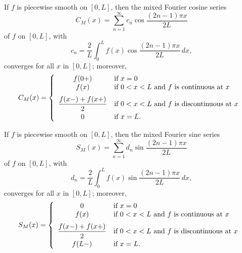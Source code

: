 \setcounter{theorem}{2}
\begin{theorem}
  \label{thmtype:11.3.3} If $f$ is piecewise smooth on $[0,L]$, then the mixed Fourier cosine series
  \[
    C_{M}(x)=\sum_{n=1}^{\infty}c_{n}\cos\frac{(2n-1)\pi x}{2L}
  \]
  of $f$ on $[0,L]$, with
  \[
    c_{n}=\frac{2}{L}\int_{0}^{L}f(x)\cos\frac{(2n-1)\pi x}{2L}\,dx,
  \]
  converges for all $x$ in $[0,L]$; moreover,
  \[
    C_{M}(x)= \left\{
    \begin{array}{cl}
      f(0+)                     & \mbox{if $x=0$}                                    \\
      f(x)                      & \mbox{if $0<x<L$ and $f$ is continuous at $x$ }    \\[2\jot]
      \displaystyle\frac{f(x-)+f(x+)}{2} & \mbox{if $0<x<L$ and $f$ is discontinuous at $x$ } \\[2\jot]
      0                         & \mbox{if $x=L$.}
    \end{array}\right.
  \]
\end{theorem}

\setcounter{theorem}{3}
\begin{theorem}
  \label{thmtype:11.3.4} If $f$ is piecewise smooth on $[0,L]$, then the mixed Fourier sine series
  \[
    S_{M}(x)=\sum_{n=1}^{\infty}d_{n}\sin\frac{(2n-1)\pi x}{2L}
  \]
  of $f$ on $[0,L]$, with
  \[
    d_{n}=\frac{2}{L}\int_{0}^{L}f(x)\sin\frac{(2n-1)\pi x}{2L}\,dx,
  \]
  converges for all $x$ in $[0,L]$; moreover,
  \[
    S_{M}(x)= \left\{
    \begin{array}{cl}
      0                         & \mbox{if $x=0$}                                    \\
      f(x)                      & \mbox{if $0<x<L$ and $f$ is continuous at $x$ }    \\[2\jot]
      \displaystyle\frac{f(x-)+f(x+)}{2} & \mbox{if $0<x<L$ and $f$ is discontinuous at $x$ } \\[2\jot]
      f(L-)                     & \mbox{if $x=L$.}
    \end{array}\right.
  \]
\end{theorem}

